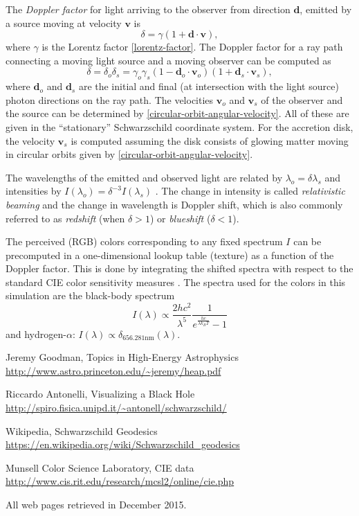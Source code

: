 \documentclass[a4paper,12pt]{article}
\def\mb{\boldsymbol}
\begin{document}
The \emph{Doppler factor} for light arriving to the observer from direction $\mb d$, emitted by a source moving at velocity $\mb v$ is \cite[\S 1.7]{astro-princeton}
\begin{equation}\label{doppler-factor-moving-source}
  \delta = \gamma (1 + \mb d \cdot \mb v),
\end{equation}
where $\gamma$ is the Lorentz factor \eqref{lorentz-factor}.
The Doppler factor for a ray path connecting a moving light source and a moving observer can be computed as
$$
 \delta = \delta_o \delta_s = \gamma_o \gamma_s (1 - \mb d_o \cdot \mb v_o)(1 + \mb d_s \cdot \mb v_s),
$$
where $\mb d_o$ and $\mb d_s$ are the initial and final (at intersection with the light source) photon directions on the ray path. The velocities $\mb v_o$ and $\mb v_s$ of the observer and the source can be determined by \eqref{circular-orbit-angular-velocity}. All of these are given in the ``stationary'' Schwarzschild coordinate system.
For the accretion disk, the velocity $\mb v_s$ is computed assuming the disk consists of glowing matter moving in circular orbits given by \eqref{circular-orbit-angular-velocity}.

The wavelengths of the emitted and observed light are related by $\lambda_o = \delta \lambda_s$ and intensities by $I(\lambda_o) = \delta^{-3} I(\lambda_s)$ \cite{astro-princeton}. The change in intensity is called \emph{relativistic beaming} and the change in wavelength is Doppler shift, which is also commonly referred to as \emph{redshift} (when $\delta > 1$) or \emph{blueshift} ($\delta < 1$).

The perceived (RGB) colors corresponding to any fixed spectrum $I$ can be precomputed in a one-dimensional lookup table (texture) as a function of the Doppler factor. This is done by integrating the shifted spectra with respect to the standard CIE color sensitivity measures \cite{cie:data}. The spectra used for the colors in this simulation are the black-body spectrum
$$
  I(\lambda) \propto \frac{2 h c^2}{\lambda^5}\frac1{e^{\frac{h c}{\lambda k_B T}} - 1}
$$
and hydrogen-$\alpha$: $I(\lambda) \propto \delta_{656.281 {\mathrm{nm}}}(\lambda)$.

\clearpage
\begin{thebibliography}{9}

 Jeremy Goodman, Topics in High-Energy Astrophysics
\newblock \url{http://www.astro.princeton.edu/~jeremy/heap.pdf}

 Riccardo Antonelli, Visualizing a Black Hole
\newblock \url{http://spiro.fisica.unipd.it/~antonell/schwarzschild/}

 Wikipedia, Schwarzschild Geodesics
\newblock \url{https://en.wikipedia.org/wiki/Schwarzschild_geodesics}

 Munsell Color Science Laboratory, CIE data
\newblock \url{http://www.cis.rit.edu/research/mcsl2/online/cie.php}


\end{thebibliography}

\noindent
All web pages retrieved in December 2015.
\end{document}

